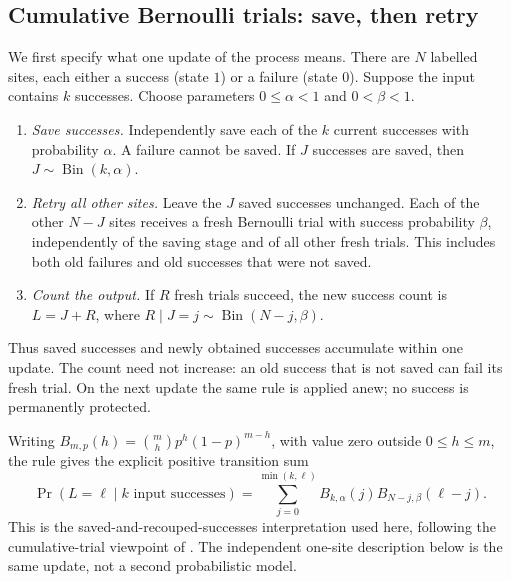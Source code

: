\documentclass[11pt,reqno]{amsart}
\theoremstyle{remark}\newtheorem{remark}[theorem]{Remark}
\begin{document}
\subsection*{Cumulative Bernoulli trials: save, then retry}
We first specify what one update of the process means. There are $N$
labelled sites, each either a success (state $1$) or a failure (state
$0$). Suppose the input contains $k$ successes. Choose parameters
$0\le\alpha<1$ and $0<\beta<1$.
\begin{enumerate}
\item \emph{Save successes.} Independently save each of the $k$ current
successes with probability $\alpha$. A failure cannot be saved.
If $J$ successes are saved, then $J\sim\operatorname{Bin}(k,\alpha)$.
\item \emph{Retry all other sites.} Leave the $J$ saved successes
unchanged. Each of the other $N-J$ sites receives a fresh Bernoulli
trial with success probability $\beta$, independently of the saving
stage and of all other fresh trials. This includes both old failures
and old successes that were not saved.
\item \emph{Count the output.} If $R$ fresh trials succeed, the new
success count is $L=J+R$, where
$R\mid J=j\sim\operatorname{Bin}(N-j,\beta)$.
\end{enumerate}
Thus saved successes and newly obtained successes accumulate within
one update. The count need not increase: an old success that is not
saved can fail its fresh trial. On the next update the same rule is
applied anew; no success is permanently protected.

Writing $B_{m,p}(h)=\binom mhp^h(1-p)^{m-h}$, with value zero outside
$0\le h\le m$, the rule gives the explicit positive transition sum
\[
\Pr(L=\ell\mid k\text{ input successes})
=\sum_{j=0}^{\min(k,\ell)}B_{k,\alpha}(j)B_{N-j,\beta}(\ell-j).
\]
This is the saved-and-recouped-successes interpretation used here,
following the cumulative-trial viewpoint of \cite{HoareRahman1984}.
The independent one-site description below is the same update, not a
second probabilistic model.
\end{document}
